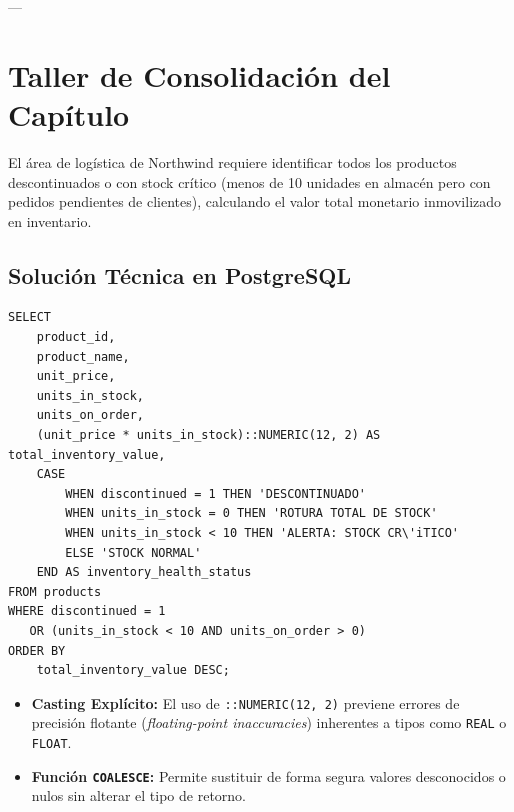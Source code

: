 ---

\section{Taller de Consolidaci\'on del Cap\'itulo}

\begin{businessproblem}
El \'area de log\'istica de Northwind requiere identificar todos los productos descontinuados o con stock cr\'itico (menos de 10 unidades en almac\'en pero con pedidos pendientes de clientes), calculando el valor total monetario inmovilizado en inventario.
\end{businessproblem}

\subsection{Soluci\'on T\'ecnica en PostgreSQL}

\begin{lstlisting}[style=sqlstyle, caption={Consulta de evaluaci\'on de riesgo de stock e inventario}]
SELECT
    product_id,
    product_name,
    unit_price,
    units_in_stock,
    units_on_order,
    (unit_price * units_in_stock)::NUMERIC(12, 2) AS total_inventory_value,
    CASE
        WHEN discontinued = 1 THEN 'DESCONTINUADO'
        WHEN units_in_stock = 0 THEN 'ROTURA TOTAL DE STOCK'
        WHEN units_in_stock < 10 THEN 'ALERTA: STOCK CR\'iTICO'
        ELSE 'STOCK NORMAL'
    END AS inventory_health_status
FROM products
WHERE discontinued = 1
   OR (units_in_stock < 10 AND units_on_order > 0)
ORDER BY
    total_inventory_value DESC;
\end{lstlisting}

\begin{engtip}
\begin{itemize}
    \item \textbf{Casting Expl\'icito:} El uso de \texttt{::NUMERIC(12, 2)} previene errores de precisi\'on flotante (\textit{floating-point inaccuracies}) inherentes a tipos como \texttt{REAL} o \texttt{FLOAT}.
    \item \textbf{Funci\'on \texttt{COALESCE}:} Permite sustituir de forma segura valores desconocidos o nulos sin alterar el tipo de retorno.
\end{itemize}
\end{engtip}
